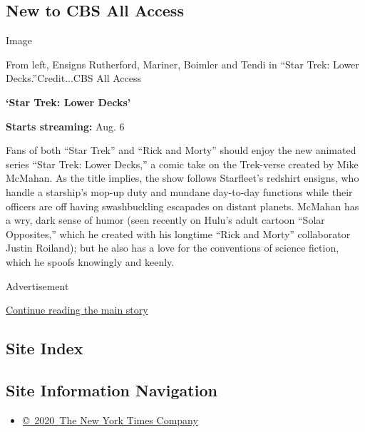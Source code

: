 \hypertarget{new-to-cbs-all-access}{%
\subsection{New to CBS All Access}\label{new-to-cbs-all-access}}

Image

From left, Ensigns Rutherford, Mariner, Boimler and Tendi in ``Star
Trek: Lower Decks.''Credit...CBS All Access

\textbf{`Star Trek: Lower Decks'}

\textbf{Starts streaming:} Aug. 6

Fans of both ``Star Trek'' and ``Rick and Morty'' should enjoy the new
animated series ``Star Trek: Lower Decks,'' a comic take on the
Trek-verse created by Mike McMahan. As the title implies, the show
follows Starfleet's redshirt ensigns, who handle a starship's mop-up
duty and mundane day-to-day functions while their officers are off
having swashbuckling escapades on distant planets. McMahan has a wry,
dark sense of humor (seen recently on Hulu's adult cartoon ``Solar
Opposites,'' which he created with his longtime ``Rick and Morty''
collaborator Justin Roiland); but he also has a love for the conventions
of science fiction, which he spoofs knowingly and keenly.

Advertisement

\protect\hyperlink{after-bottom}{Continue reading the main story}

\hypertarget{site-index}{%
\subsection{Site Index}\label{site-index}}

\hypertarget{site-information-navigation}{%
\subsection{Site Information
Navigation}\label{site-information-navigation}}

\begin{itemize}
\tightlist
\item
  \href{https://help.nytimes.com/hc/en-us/articles/115014792127-Copyright-notice}{©~2020~The
  New York Times Company}
\end{itemize}


